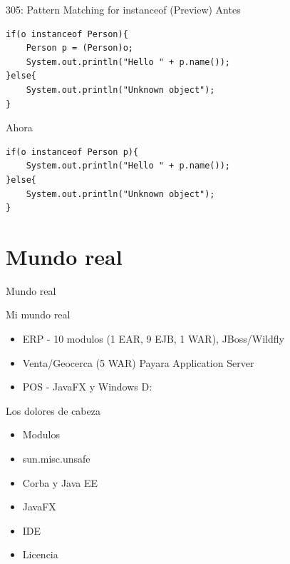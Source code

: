 \documentclass[aspectratio=169]{beamer}
\begin{document}
\begin{frame}[fragile]{305:	Pattern Matching for instanceof (Preview)}
Antes
\begin{lstlisting}
if(o instanceof Person){
    Person p = (Person)o;
    System.out.println("Hello " + p.name());
}else{
    System.out.println("Unknown object");
}
\end{lstlisting}	

Ahora
\begin{lstlisting}
if(o instanceof Person p){
    System.out.println("Hello " + p.name());
}else{
    System.out.println("Unknown object");
}
\end{lstlisting}	
\end{frame}

{
    \section{Mundo real}
}

\begin{frame}[fragile]{Mundo real}\scriptsize
    
Mi mundo real
    \begin{itemize}
        \item ERP - 10 modulos (1 EAR, 9 EJB, 1 WAR), JBoss/Wildfly
        \item Venta/Geocerca (5 WAR) Payara Application Server
        \item POS - JavaFX y Windows D:
    \end{itemize}
Los dolores de cabeza
\begin{itemize}
    \item Modulos
    \item sun.misc.unsafe
    \item Corba y Java EE
    \item JavaFX
    \item IDE
    \item Licencia
\end{itemize}
\end{frame}
\end{document}
